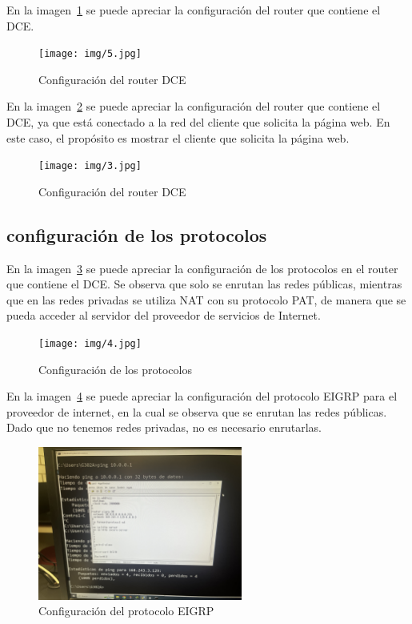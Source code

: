     En la imagen~\ref{fig:Imagen_Ejemplo5} se puede apreciar la configuración del router que contiene el DCE.

    \begin{figure}[H]
        \centering
        \texttt{[image: img/5.jpg]}
        \caption{Configuración del router DCE}
        \label{fig:Imagen_Ejemplo5}
    \end{figure}

    En la imagen~\ref{fig:Router DCE Empresa 1} se puede apreciar la configuración del router que contiene el DCE, ya que está conectado a la red del cliente que solicita la página web. En este caso, el propósito es mostrar el cliente que solicita la página web.

    \begin{figure}[H]
        \centering
        \texttt{[image: img/3.jpg]}
        \caption{Configuración del router DCE}
        \label{fig:Router DCE Empresa 1}
    \end{figure}

    \subsection{configuración de los protocolos}
    En la imagen~\ref{fig:NAT empresa 1} se puede apreciar la configuración de los protocolos en el router que contiene el DCE. Se observa que solo se enrutan las redes públicas, mientras que en las redes privadas se utiliza NAT con su protocolo PAT, de manera que se pueda acceder al servidor del proveedor de servicios de Internet.
    
    \begin{figure}[H]
        \centering
        \texttt{[image: img/4.jpg]}
        \caption{Configuración de los protocolos}
        \label{fig:NAT empresa 1}
    \end{figure}

    En la imagen~\ref{fig:EIGRP isp} se puede apreciar la configuración del protocolo EIGRP para el proveedor de internet, en la cual se observa que se enrutan las redes públicas. Dado que no tenemos redes privadas, no es necesario enrutarlas.

    \begin{figure}[H]
        \centering
        \includegraphics[width=0.6\textwidth]{img/6.jpg}
        \caption{Configuración del protocolo EIGRP}
        \label{fig:EIGRP isp}
    \end{figure}

